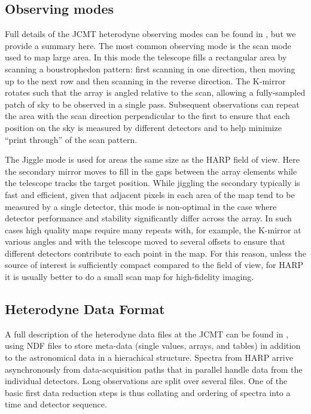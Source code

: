 \documentclass[final,authoryear,5p,times,twocolumn]{elsarticle}
\begin{document}
\subsection{Observing modes}
\label{sec:obsmodes}

Full details of the JCMT heterodyne observing modes can be found in
\citet{2009MNRAS.399.1026B}, but we provide a summary here. The most
common observing mode is the scan mode used to map large area. In this
mode the telescope fills a rectangular area by scanning a
boustrophedon pattern: first scanning in one direction, then moving up
to the next row and then scanning in the reverse direction. The
K-mirror rotates such that the array is angled relative to the scan,
allowing a fully-sampled patch of sky to be observed in a single
pass. Subsequent observations can repeat the area with the scan
direction perpendicular to the first to ensure that each position on
the sky is measured by different detectors and to help minimize
``print through'' of the scan pattern.

The Jiggle mode is used for areas the same size as the HARP field of
view. Here the secondary mirror moves to fill in the gaps between the
array elements while the telescope tracks the target position.  While
jiggling the secondary typically is fast and efficient, given that
adjacent pixels in each area of the map tend to be measured by a
single detector, this mode is non-optimal in the case where detector
performance and stability significantly differ across the array. In
such cases high quality maps require many repeats with, for example,
the K-mirror at various angles and with the telescope moved to several
offsets to ensure that different detectors contribute to each point in
the map. For this reason, unless the source of interest is
sufficiently compact compared to the field of view, for HARP it is
usually better to do a small scan map for high-fidelity imaging.


\subsection{Heterodyne Data Format}
\label{sec:format}

A full description of the heterodyne data files at the JCMT can be
found in \citet{OCS_ICD_022}, using NDF files \citep{2015NDF} to store
meta-data (single values, arrays, and tables) in addition to the astronomical
data in a hierachical structure. Spectra from HARP arrive
asynchronously from data-acquisition paths that in parallel handle
data from the individual detectors. Long observations are split
over several files. One of the basic first data reduction steps is thus
collating and ordering of spectra into a time and detector sequence.
\end{document}
